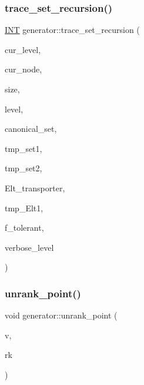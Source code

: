 \subsubsection{\texorpdfstring{trace\+\_\+set\+\_\+recursion()}{trace\_set\_recursion()}}
{\footnotesize\ttfamily \mbox{\hyperlink{galois_8h_a09fddde158a3a20bd2dcadb609de11dc}{I\+NT}} generator\+::trace\+\_\+set\+\_\+recursion (\begin{DoxyParamCaption}\item[{\mbox{\hyperlink{galois_8h_a09fddde158a3a20bd2dcadb609de11dc}{I\+NT}}}]{cur\+\_\+level,  }\item[{\mbox{\hyperlink{galois_8h_a09fddde158a3a20bd2dcadb609de11dc}{I\+NT}}}]{cur\+\_\+node,  }\item[{\mbox{\hyperlink{galois_8h_a09fddde158a3a20bd2dcadb609de11dc}{I\+NT}}}]{size,  }\item[{\mbox{\hyperlink{galois_8h_a09fddde158a3a20bd2dcadb609de11dc}{I\+NT}}}]{level,  }\item[{\mbox{\hyperlink{galois_8h_a09fddde158a3a20bd2dcadb609de11dc}{I\+NT}} $\ast$}]{canonical\+\_\+set,  }\item[{\mbox{\hyperlink{galois_8h_a09fddde158a3a20bd2dcadb609de11dc}{I\+NT}} $\ast$}]{tmp\+\_\+set1,  }\item[{\mbox{\hyperlink{galois_8h_a09fddde158a3a20bd2dcadb609de11dc}{I\+NT}} $\ast$}]{tmp\+\_\+set2,  }\item[{\mbox{\hyperlink{galois_8h_a09fddde158a3a20bd2dcadb609de11dc}{I\+NT}} $\ast$}]{Elt\+\_\+transporter,  }\item[{\mbox{\hyperlink{galois_8h_a09fddde158a3a20bd2dcadb609de11dc}{I\+NT}} $\ast$}]{tmp\+\_\+\+Elt1,  }\item[{\mbox{\hyperlink{galois_8h_a09fddde158a3a20bd2dcadb609de11dc}{I\+NT}}}]{f\+\_\+tolerant,  }\item[{\mbox{\hyperlink{galois_8h_a09fddde158a3a20bd2dcadb609de11dc}{I\+NT}}}]{verbose\+\_\+level }\end{DoxyParamCaption})}

\mbox{\label{classgenerator_ad8842983b197430759b0588712c26693}} 
\subsubsection{\texorpdfstring{unrank\+\_\+point()}{unrank\_point()}}
{\footnotesize\ttfamily void generator\+::unrank\+\_\+point (\begin{DoxyParamCaption}\item[{\mbox{\hyperlink{galois_8h_a09fddde158a3a20bd2dcadb609de11dc}{I\+NT}} $\ast$}]{v,  }\item[{\mbox{\hyperlink{galois_8h_a09fddde158a3a20bd2dcadb609de11dc}{I\+NT}}}]{rk }\end{DoxyParamCaption})}

